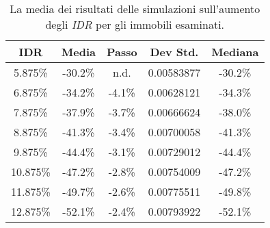 \begin{table}[htbp]
\begin{center}
\begin{tabular}[c]{|c||*{4}{c|}}
\hline
IDR & Media & Passo & Dev Std. & Mediana \\
\hline \hline
5.875\% & -30.2\% &  n.d. & 0.00583877 & -30.2\% \\ \hline
6.875\% & -34.2\% & -4.1\% & 0.00628121 & -34.3\% \\ \hline
7.875\% & -37.9\% & -3.7\% & 0.00666624 & -38.0\% \\ \hline
8.875\% & -41.3\% & -3.4\% & 0.00700058 & -41.3\% \\ \hline
9.875\% & -44.4\% & -3.1\% & 0.00729012 & -44.4\% \\ \hline
10.875\% & -47.2\% & -2.8\% & 0.00754009 & -47.2\% \\ \hline
11.875\% & -49.7\% & -2.6\% & 0.00775511 & -49.8\% \\ \hline
12.875\% & -52.1\% & -2.4\% & 0.00793922 & -52.1\% \\ \hline
\end{tabular}
\caption[Media risultati di un $\Delta^{+}$ IDR]{La media dei risultati delle simulazioni sull'aumento degli {\itshape IDR} per gli immobili esaminati.}
\label{tab:varidrsintesi}
\end{center}
\end{table}
